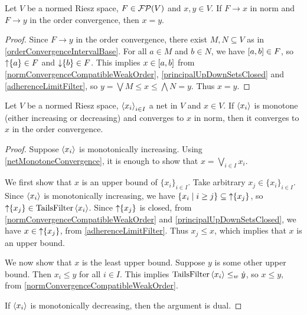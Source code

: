 \begin{proposition}
Let $V$ be a normed Riesz space, $F\in\operatorname{\mathcal{FP}}(V)$ and $x,y\in V$. If $F \to x$ in norm and $F\to y$ in the order convergence, then $x = y$.
\end{proposition}
\begin{proof}
Since $F\to y$ in the order convergence, there exist $M,N \subseteq V$ as in \ref{orderConvergenceIntervalBase}. For all $a\in M$ and $b\in N$, we have $\interval{a,b} \in F$, so $\operatorname{\uparrow}\{a\}\in F$ and $\operatorname{\downarrow} \{b\} \in F$. This implies $x\in \interval{a,b}$ from \ref{normConvergenceCompatibleWeakOrder}, \ref{principalUpDownSetsClosed} and \ref{adherenceLimitFilter}, so $y =\bigvee M \leq x \leq \bigwedge N = y$. Thus $x = y$.
\end{proof}

\begin{proposition}
Let $V$ be a normed Riesz space, $\left\langle x_i \right\rangle_{i\in I}$ a net in $V$ and $x\in V$. If $\left\langle x_i \right\rangle$ is monotone (either increasing or decreasing) and converges to $x$ in norm, then it converges to $x$ in the order convergence.
\end{proposition}
\begin{proof}
Suppose $\left\langle x_i \right\rangle$ is monotonically increasing. Using \ref{netMonotoneConvergence}, it is enough to show that $x = \bigvee_{i\in I}x_i$.

We first show that $x$ is an upper bound of $\{x_i\}_{i\in I}$. Take arbitrary $x_j\in \{x_i\}_{i\in I}$. Since $\left\langle x_i \right\rangle$ is monotonically increasing, we have $\setbuilder{x_i}{i\geq j} \subseteq \upset\{x_j\}$, so $\operatorname{\uparrow}\{x_j\} \in \operatorname{TailsFilter}\left\langle x_i \right\rangle$. Since $\operatorname{\uparrow}\{x_j\}$ is closed, from \ref{normConvergenceCompatibleWeakOrder} and \ref{principalUpDownSetsClosed}, we have $x \in \operatorname{\uparrow}\{x_j\}$, from \ref{adherenceLimitFilter}. Thus $x_j \leq x$, which implies that $x$ is an upper bound.

We now show that $x$ is the least upper bound. Suppose $y$ is some other upper bound. Then $x_i \leq y$ for all $i\in I$. This implies $\operatorname{TailsFilter}\left\langle x_i \right\rangle \leq_w \dot{y}$, so $x \leq y$, from \ref{normConvergenceCompatibleWeakOrder}.

If $\left\langle x_i \right\rangle$ is monotonically decreasing, then the argument is dual.
\end{proof}

